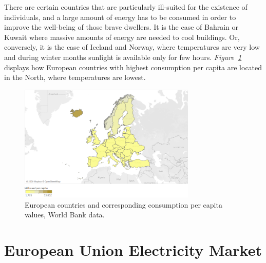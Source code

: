 \documentclass[a4paper,12pt]{book}
\begin{document}
There are certain countries that are particularly ill-suited for the existence of individuals, and a large amount of energy has to be consumed in order to improve the well-being of those brave dwellers. It is the case of Bahrain or Kuwait where massive amounts of energy are needed to cool buildings. Or, conversely, it is the case of Iceland and Norway, where temperatures are very low and during winter months sunlight is available only for few hours. \textit{Figure~\ref{fig:conspc}} displays how European countries with highest consumption per capita are located in the North, where temperatures are lowest.

\begin{figure}[hbt]
\begin{center}
\captionsetup{justification=centering}
\includegraphics[width=0.75\textwidth]{Images/cons.png}
\caption{European countries and corresponding consumption per capita values, World Bank data. }
\label{fig:conspc}
\end{center}
\end{figure}

\section{European Union Electricity Market}
\end{document}
